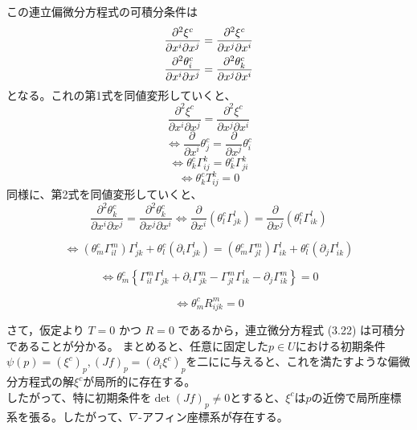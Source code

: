 \documentclass[a4paper,11pt]{jsarticle}
\numberwithin{equation}{section}
\begin{document}
この連立偏微分方程式の可積分条件は
    \begin{align}
        \pdv[2]{\xi^c}{x^i}{x^j} &= \pdv[2]{\xi^c}{x^j}{x^i} \\
        \pdv[2]{\theta^c_i}{x^i}{x^j} &= \pdv[2]{\theta^c_k}{x^j}{x^i}
    \end{align}
となる。これの第1式を同値変形していくと、
\begin{equation}
    \frac{\partial^2 \xi^c}{\partial x^i \partial x^j} = \frac{\partial^2 \xi^c}{\partial x^j \partial x^i}
\end{equation}
\begin{equation}
    \Leftrightarrow \frac{\partial}{\partial x^i} \theta^c_j = \frac{\partial}{\partial x^j} \theta^c_i
\end{equation}
\begin{equation}
    \Leftrightarrow \theta^c_k \Gamma^k_{ij} = \theta^c_k \Gamma^k_{ji}
\end{equation}
\begin{equation}
    \Leftrightarrow \theta^c_k T^k_{ij} = 0
\end{equation}
同様に、第2式を同値変形していくと、
\begin{equation}
    \frac{\partial^2 \theta^c_k}{\partial x^i \partial x^j} = \frac{\partial^2 \theta^c_k}{\partial x^j \partial x^i} \iff \frac{\partial}{\partial x^i} (\theta^c_l \Gamma^l_{jk}) = \frac{\partial}{\partial x^j} (\theta^c_l \Gamma^l_{ik})
\end{equation}

\begin{equation}
    \iff (\theta^c_m \Gamma^m_{il}) \Gamma^l_{jk} + \theta^c_l \left( \partial_i \Gamma^l_{jk} \right) = (\theta^c_m \Gamma^m_{jl}) \Gamma^l_{ik} + \theta^c_l \left( \partial_j \Gamma^l_{ik} \right)
\end{equation}

\begin{equation}
    \iff \theta^c_m \left\{ \Gamma^m_{il} \Gamma^l_{jk} + \partial_i \Gamma^m_{jk} - \Gamma^m_{jl} \Gamma^l_{ik} - \partial_j \Gamma^m_{ik} \right\} = 0
\end{equation}

\begin{equation}
    \iff \theta^c_m R^m_{ijk} = 0
\end{equation}

さて，仮定より \(T = 0\) かつ \(R = 0\) であるから，連立微分方程式 (3.22) は可積分であることが分かる。
まとめると、任意に固定した$p \in U$における初期条件$\psi(p)=(\xi^c)_p,(Jf)_p=(\partial_i \xi^c)_p$を二にに与えると、これを満たすような偏微分方程式の解$\xi^c$が局所的に存在する。\\
したがって、特に初期条件を$\det(Jf)_p\neq 0$とすると、$\xi^c$は$p$の近傍で局所座標系を張る。したがって、$\nabla$-アフィン座標系が存在する。\hfill\qedsymbol
\end{document}
